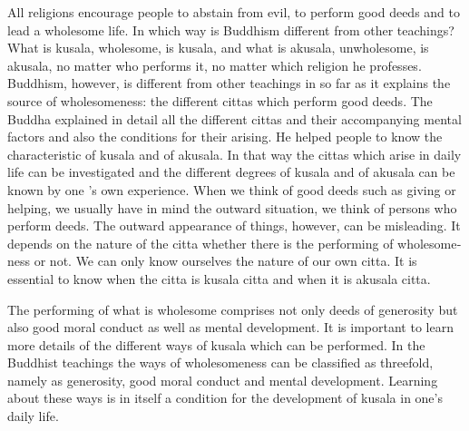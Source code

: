 \documentclass{book}
\begin{document}
All religions encourage people to abstain from evil, to perform good
deeds and to lead a wholesome life. In which way is Buddhism different
from other teachings? What is kusala, wholesome, is kusala, and what is
akusala, unwholesome, is akusala, no matter who performs it, no matter
which religion he professes. Buddhism, however, is different from other
teachings in so far as it explains the source of wholesomeness: the
different cittas which perform good deeds. The Buddha explained in
detail all the different cittas and their accompanying mental factors
and also the conditions for their arising. He helped people to know the
characteristic of kusala and of akusala. In that way the cittas which
arise in daily life can be investigated and the different degrees of
kusala and of akusala can be known by one 's own experience. When we
think of good deeds such as giving or helping, we usually have in mind
the outward situation, we think of persons who perform deeds. The
outward appearance of things, however, can be misleading. It depends on
the nature of the citta whether there is the performing of
whole­some­ness or not. We can only know ourselves the nature of our own
citta. It is essential to know when the citta is kusala citta and when
it is akusala citta.

The performing of what is wholesome comprises not only deeds of
generosity but also good moral conduct as well as mental development. It
is important to learn more details of the different ways of kusala which
can be performed. In the Buddhist teachings the ways of wholesomeness
can be classified as threefold, namely as generosity, good moral conduct
and mental development. Learning about these ways is in itself a
condition for the development of kusala in one's daily life.
\end{document}
